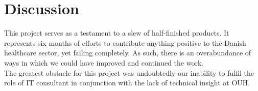 \section{Discussion}
This project serves as a testament to a slew of half-finished products. It represents six months of efforts to contribute anything positive to the Danish healthcare sector, yet failing completely. As such, there is an overabundance of ways in which we could have improved and continued the work.
\\
The greatest obstacle for this project was undoubtedly our inability to fulfil the role of IT consultant in conjunction with the lack of technical insight at OUH.